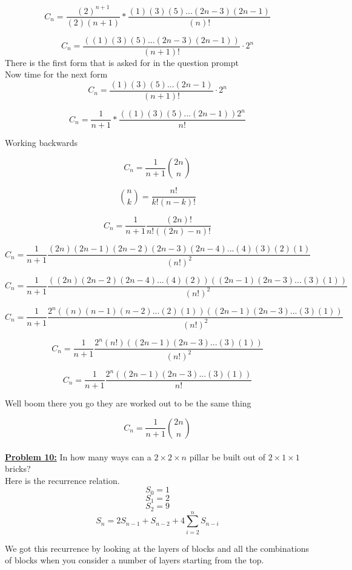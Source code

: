 \documentclass[10pt, AMS Euler]{article}
\begin{document}
    $$ C_n = \frac{ (2)^{n+1} }{(2)(n+1)} * \frac{(1)(3)(5)...(2n-3)(2n-1)}{(n)!} $$

    $$ C_n = \frac{((1)(3)(5)...(2n-3)(2n-1))}{(n+1)!} \cdot 2^n $$
    There is the first form that is asked for in the question prompt \\
    Now time for the next form
    $$ C_n = \frac{(1)(3)(5)...(2n-1)}{(n+1)!} \cdot 2^n $$

    $$ C_n = \frac{1}{n+1} * \frac{((1)(3)(5)...(2n-1))2^n}{n!} $$

    Working backwards
    
    $$ C_n = \frac{1}{n+1} \binom{2n}{n} $$

    $$ \binom{n}{k} = \frac{n!}{k!(n-k)!} $$

    $$ C_n = \frac{1}{n+1} \frac{(2n)!}{n!((2n)-n)!} $$

    $$ C_n = \frac{1}{n+1} \frac{(2n)(2n-1)(2n-2)(2n-3)(2n-4)...(4)(3)(2)(1)}{(n!)^2} $$
    
    $$ C_n = \frac{1}{n+1} \frac{((2n)(2n-2)(2n-4)...(4)(2))((2n-1)(2n-3)...(3)(1))}{(n!)^2} $$

    $$ C_n = \frac{1}{n+1} \frac{2^n((n)(n-1)(n-2)...(2)(1))((2n-1)(2n-3)...(3)(1))}{(n!)^2} $$  

    $$ C_n = \frac{1}{n+1} \frac{2^n(n!)((2n-1)(2n-3)...(3)(1))}{(n!)^2} $$ 

    $$ C_n = \frac{1}{n+1} \frac{2^n((2n-1)(2n-3)...(3)(1))}{n!} $$

    Well boom there you go they are worked out to be the same thing

    $$ C_n = \frac{1}{n+1} \binom{2n}{n} $$ \\
	
	\noindent\underline{\bf Problem 10:}  In how many ways can a $2 \times 2 \times n$ pillar be built out of $2 \times 1 \times 1$ bricks?\\
 
    Here is the recurrence relation.
    $$ S_0 = 1 $$
    $$ S_1 = 2 $$
    $$ S_2 = 9 $$
    $$ S_n = 2 S_{n-1} + S_{n-2} + 4 \sum_{i = 2}^n S_{n-i} $$

    We got this recurrence by looking at the layers of blocks and all the combinations of blocks when you consider a number of layers starting from the top.\\ 
    
\end{document}
